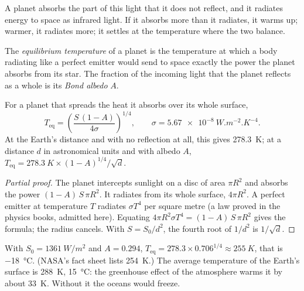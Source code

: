A planet absorbs the part of this light that it does not reflect, and it
radiates energy to space as infrared light. If it absorbs more than it
radiates, it warms up; warmer, it radiates more; it settles at the
temperature where the two balance.

\begin{definition}\label{def:g10:habitable-planet:equilibrium-temperature}
The \emph{equilibrium temperature} of a
planet is the temperature at which a body radiating like a perfect emitter
would send to space exactly the power the planet absorbs from its star. The
fraction of the incoming light that the planet reflects as a whole is its
\emph{Bond albedo} $A$.
\end{definition}

\begin{proposition}\label{prop:g10:habitable-planet:teq}
For a planet that spreads the heat it absorbs over its whole surface,
\[
  T_{\mathrm{eq}} = \left(\frac{S\,(1-A)}{4\sigma}\right)^{1/4},
  \qquad \sigma = \qty{5.67e-8}{W.m^{-2}.K^{-4}}.
\]
At the Earth's distance and with no reflection at all, this gives
\qty{278.3}{K}; at a distance $d$ in astronomical units and with albedo $A$,
$T_{\mathrm{eq}} = \qty{278.3}{K} \times (1-A)^{1/4}/\sqrt{d}$.
\end{proposition}

\begin{proof}[Partial proof]
The planet intercepts sunlight on a disc of area $\pi R^2$ and absorbs the
power $(1-A)\,S\,\pi R^2$. It radiates from its whole surface, $4\pi R^2$.
A perfect emitter at temperature $T$ radiates $\sigma T^4$ per square
metre (a law proved in the physics books, admitted here). Equating
$4\pi R^2 \sigma T^4 = (1-A)\,S\,\pi R^2$ gives the formula; the radius
cancels. With $S = S_0/d^2$, the fourth root of $1/d^2$ is $1/\sqrt d$.
\end{proof}

\begin{example}\label{ex:g10:habitable-planet:earth}
With $S_0 = \qty{1361}{W/m^2}$ and $A = 0.294$,
$T_{\mathrm{eq}} = 278.3 \times 0.706^{1/4} \approx \qty{255}{K}$, that is
\qty{-18}{\degreeCelsius}. (NASA's fact sheet lists \qty{254}{K}.) The
average temperature of the Earth's surface is \qty{288}{K},
\qty{15}{\degreeCelsius}: the greenhouse effect of the atmosphere warms it by
about \qty{33}{K}. Without it the oceans would freeze.
\end{example}

